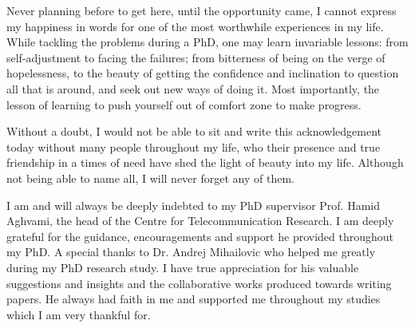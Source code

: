 

\begin{acknowledgements}      %

Never planning before to get here, until the opportunity came, I cannot express my happiness in words for one of the most worthwhile experiences in my life. While tackling the problems during a PhD, one may learn invariable lessons: from self-adjustment to facing the failures; from bitterness of being on the verge of hopelessness, to the beauty of getting the confidence and inclination to question all that is around, and seek out new ways of doing it. Most importantly, the lesson of learning to push yourself out of comfort zone to make progress.

Without a doubt, I would not be able to sit and write this acknowledgement today without many people throughout my life, who their presence and true friendship in a times of need have shed the light of beauty into my life. Although not being able to name all, I will never forget any of them.

I am and will always be deeply indebted to my PhD supervisor Prof. Hamid Aghvami, the head of the Centre for Telecommunication Research. I am deeply grateful for the guidance, encouragements and support he provided throughout my PhD.
A special thanks to Dr. Andrej Mihailovic who helped me greatly during my PhD research study. I have true appreciation for his valuable suggestions and insights and the collaborative works produced towards writing papers. He always had faith in me and supported me throughout my studies which I am very thankful for.


\end{acknowledgements}



